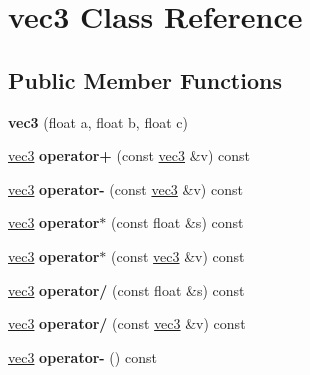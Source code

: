 \hypertarget{classvec3}{}\section{vec3 Class Reference}
\label{classvec3}
\subsection*{Public Member Functions}
\begin{DoxyCompactItemize}
\item 
\mbox{\label{classvec3_a68ac35d328cf0fb636944b727e31e9fd}} 
{\bfseries vec3} (float a, float b, float c)
\item 
\mbox{\label{classvec3_a78aeaa9f43e5a297b4dc12612c3f4998}} 
\hyperlink{classvec3}{vec3} {\bfseries operator+} (const \hyperlink{classvec3}{vec3} \&v) const
\item 
\mbox{\label{classvec3_a7979a5a17d598414b81dae6816096a41}} 
\hyperlink{classvec3}{vec3} {\bfseries operator-\/} (const \hyperlink{classvec3}{vec3} \&v) const
\item 
\mbox{\label{classvec3_a46bb1df3908f3a3942c735727fef6ecb}} 
\hyperlink{classvec3}{vec3} {\bfseries operator$\ast$} (const float \&s) const
\item 
\mbox{\label{classvec3_a68af258ec7639062e18dd5d572d1278c}} 
\hyperlink{classvec3}{vec3} {\bfseries operator$\ast$} (const \hyperlink{classvec3}{vec3} \&v) const
\item 
\mbox{\label{classvec3_a4668704b5f022222b1651e05cbf92fc4}} 
\hyperlink{classvec3}{vec3} {\bfseries operator/} (const float \&s) const
\item 
\mbox{\label{classvec3_aa80d78007c6c429d121bd88091696dd3}} 
\hyperlink{classvec3}{vec3} {\bfseries operator/} (const \hyperlink{classvec3}{vec3} \&v) const
\item 
\mbox{\label{classvec3_a90828f3b3d7ab6f25661d927a29c1ceb}} 
\hyperlink{classvec3}{vec3} {\bfseries operator-\/} () const
\item 
\mbox{\label{classvec3_ad51cffd9e2cd11357924a519a8b68b02}} 

\end{DoxyCompactItemize}
